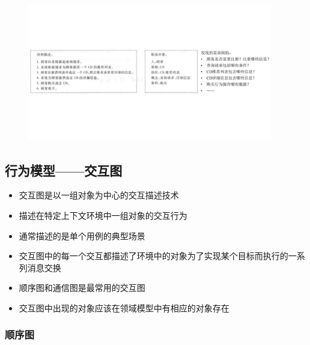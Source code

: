 \begin{figure}[H]
	\centering
	\includegraphics[width=0.95\textwidth]{img/领域模型的分析作用.pdf}
    \vspace{-1em}
\end{figure}


\subsection{行为模型——交互图}
\begin{itemize}
    \item 交互图是以一组对象为中心的交互描述技术
    \item 描述在特定上下文环境中一组对象的交互行为
    \item 通常描述的是单个用例的典型场景
    \item 交互图中的每一个交互都描述了环境中的对象为了实现某个目标而执行的一系列消息交换
    \item 顺序图和通信图是最常用的交互图
    \item 交互图中出现的对象应该在领域模型中有相应的对象存在
\end{itemize}

\subsubsection{顺序图}


